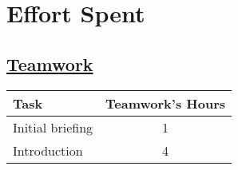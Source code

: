 \chapter{Effort Spent}

\section[Teamwork]{\hyperlink{toc}{Teamwork}}
\vspace{2mm}
\begin{center}
    \begin{tabular}{| l | c |}
        \hline
        \textbf{Task} & \textbf{Teamwork's Hours} \\ \hline
        Initial briefing & 1 \\ \hline
        Introduction & 4 \\ \hline
    \end{tabular}

\end{center}